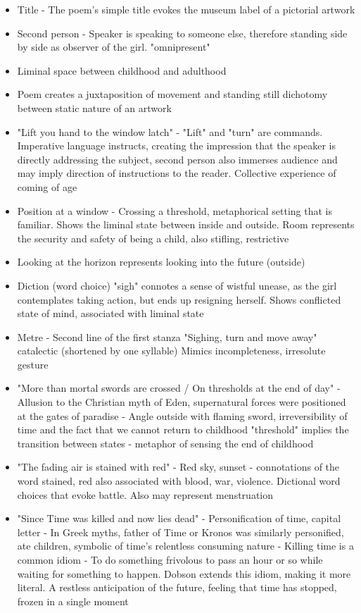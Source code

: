 		\begin{itemize}
			\item Title - The poem's simple title evokes the museum label of a pictorial artwork
			\item Second person - Speaker is speaking to someone else, therefore standing side by side as observer of the girl. "omnipresent"
			\item Liminal space between childhood and adulthood
			\item Poem creates a juxtaposition of movement and standing still
				\subitem dichotomy between static nature of an artwork
			\item "Lift you hand to the window latch" - "Lift" and "turn" are commands. Imperative language instructs, creating the impression that the speaker is directly addressing the subject, second person also immerses audience and may imply direction of instructions to the reader. Collective experience of coming of age
			\item Position at a window - Crossing a threshold, metaphorical setting that is familiar. Shows the liminal state between inside and outside. Room represents the security and safety of being a child, also stifling, restrictive
			\item Looking at the horizon represents looking into the future (outside)
			\item Diction (word choice) "sigh" connotes a sense of wistful unease, as the girl contemplates taking action, but ends up resigning herself. Shows conflicted state of mind, associated with liminal state
			\item Metre - Second line of the first stanza "Sighing, turn and move away" catalectic (shortened by one syllable) Mimics incompleteness, irresolute gesture
			\item "More than mortal swords are crossed / On thresholds at the end of day" - Allusion to the Christian myth of Eden, supernatural forces were positioned at the gates of paradise - Angle outside with flaming sword, irreversibility of time and the fact that we cannot return to childhood "threshold" implies the transition between states - metaphor of sensing the end of childhood
			\item "The fading air is stained with red" - Red sky, sunset - connotations of the word stained, red also associated with blood, war, violence. Dictional word choices that evoke battle. Also may represent menstruation
			\item "Since Time was killed and now lies dead" - Personification of time, capital letter - In Greek myths, father of Time or Kronos was similarly personified, ate children, symbolic of time's relentless consuming nature - Killing time is a common idiom - To do something frivolous to pass an hour or so while waiting for something to happen. Dobson extends this idiom, making it more literal. A restless anticipation of the future, feeling that time has stopped, frozen in a single moment
		\end{itemize}

